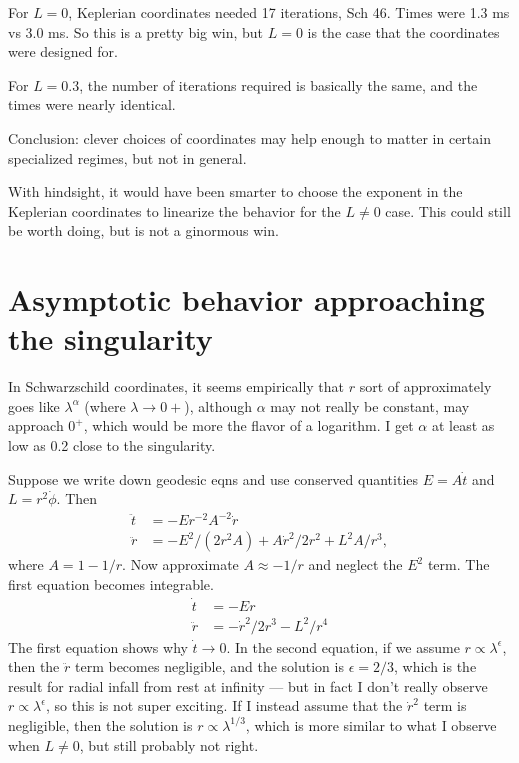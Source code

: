 \documentclass{article}
\begin{document}
For $L=0$, Keplerian coordinates needed 17 iterations, Sch 46. Times were 1.3 ms vs 3.0 ms.
So this is a pretty big win, but $L=0$ is the case that the coordinates were designed for.

For $L=0.3$, the number of iterations required is basically the same, and the times were
nearly identical.

Conclusion: clever choices of coordinates may help enough to matter
in certain specialized regimes, but not in general.

With hindsight, it would have been smarter to choose the exponent in the Keplerian coordinates
to linearize the behavior for the $L\ne0$ case. This could still be worth doing, but is not
a ginormous win.

\section{Asymptotic behavior approaching the singularity}

In Schwarzschild coordinates, 
it seems empirically that $r$ sort of approximately goes like $\lambda^\alpha$
(where $\lambda\rightarrow0+$),
although $\alpha$ may not really be constant, may approach $0^+$, which would be more the flavor
of a logarithm. I get $\alpha$ at least as low as 0.2 close to the singularity.

Suppose we write down geodesic eqns and use conserved quantities $E=A\dot{t}$ and $L=r^2\dot{\phi}$.
Then
\begin{align*}
  \ddot{t} &= -Er^{-2}A^{-2}\dot{r} \\
  \ddot{r} &= -E^2/(2r^2A)+A\dot{r}^2/2r^2+L^2A/r^3,
\end{align*}
where $A=1-1/r$. Now approximate $A\approx -1/r$ and neglect the $E^2$ term. The first equation
becomes integrable.
\begin{align*}
  \dot{t} &= -Er \\
  \ddot{r} &= -\dot{r}^2/2r^3-L^2/r^4
\end{align*}
The first equation shows why $\dot{t}\rightarrow0$. In the second equation, if we assume
$r\propto \lambda^\epsilon$, then the $\ddot{r}$ term becomes negligible, and the solution
is $\epsilon=2/3$, which is the result for radial infall from rest at infinity --- but in
fact I don't really observe $r\propto \lambda^\epsilon$, so this is not super exciting.
If I instead assume that the $\dot{r}^2$ term is negligible, then the solution is
$r\propto\lambda^{1/3}$, which is more similar to what I observe when $L\ne0$, but still probably not
right.
\end{document}
